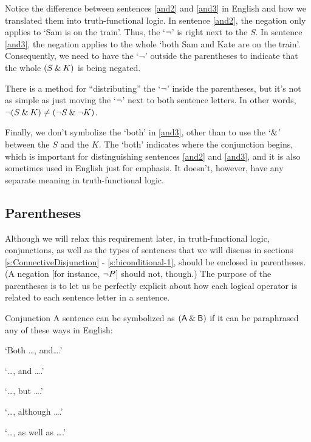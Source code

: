 Notice the difference between sentences \ref{and2} and \ref{and3} in English and how we translated them into truth-functional logic. In sentence \ref{and2}, the negation only applies to `Sam is on the train'. Thus, the `${\neg}$' is right next to the $S$. In sentence \ref{and3}, the negation applies to the whole `both Sam and Kate are on the train'. Consequently, we need to have the `${\neg}$' outside the parentheses to indicate that the whole $(S \mathbin{\&} K)$ is being negated.

\begin{notebox}
There is a method for ``distributing'' the `${\neg}$' inside the parentheses, but it's not as simple as just moving the `${\neg}$' next to both sentence letters. In other words,  ${\neg}(S \mathbin{\&} K) \neq ({\neg} S \mathbin{\&} {\neg} K)$.  
\end{notebox}


Finally, we don't symbolize the `both' in \ref{and3}, other than to use the `$\mathbin{\&}$' between the $S$ and the $K$. The `both' indicates where the conjunction begins, which is important for distinguishing sentences \ref{and2} and \ref{and3}, and it is also sometimes used in English just for emphasis. It doesn't, however, have any separate meaning in truth-functional logic.


\subsection{Parentheses}

Although we will relax this requirement later, in truth-functional logic, conjunctions, as well as the types of sentences that we will discuss in sections \ref{s:ConnectiveDisjunction} - \ref{s:biconditional-1}, should be enclosed in parentheses. (A negation [for instance, ${\neg} P$] should not, though.) The purpose of the parentheses is to let us be perfectly explicit about how each logical operator is related to each sentence letter in a sentence. 


\begin{factboxy}{Conjunction}
A sentence can be symbolized as $(\mathsf{A}\mathbin{\&}\mathsf{B})$ if it can be paraphrased any of these ways in English:
\vspace{-2mm}
\begin{earg}
\item[] `Both \ldots, and\ldots.'
\item[] `\ldots, and \ldots.'
\item[] `\ldots, but \ldots.' 
\item[] `\ldots, although \ldots.'
\item[] `\ldots, as well as \ldots.'
\end{earg}
\end{factboxy}
	




